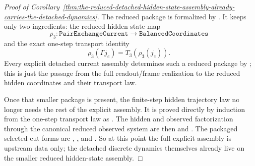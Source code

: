 \begin{proof}[Proof of Corollary~\ref{thm:the-reduced-detached-hidden-state-assembly-already-carries-the-detached-dynamics}]
\label{proof:thm:the-reduced-detached-hidden-state-assembly-already-carries-the-detached-dynamics}
The reduced package is formalized by .
It keeps only two ingredients: the reduced hidden-state map
\[
\rho_3 : \texttt{PairExchangeCurrent}\to\texttt{BalancedCoordinates}
\]
and the exact one-step transport identity
\[
\rho_3(\Gamma j_e)=T_3(\rho_3(j_e)).
\]
Every explicit detached current assembly determines such a reduced package by
; this is
just the passage from the full readout/frame realization to the reduced hidden
coordinates and their transport law.

Once that smaller package is present, the finite-step hidden trajectory law no
longer needs the rest of the explicit assembly. It is proved directly by
induction from the one-step transport law as
. The hidden
and observed factorization through the canonical reduced observed system are
then
 and
. The
packaged selected-cut forms are
,
,
and
.
So at this point the full explicit assembly is upstream data only; the
detached discrete dynamics themselves already live on the smaller reduced
hidden-state assembly.
\end{proof}

